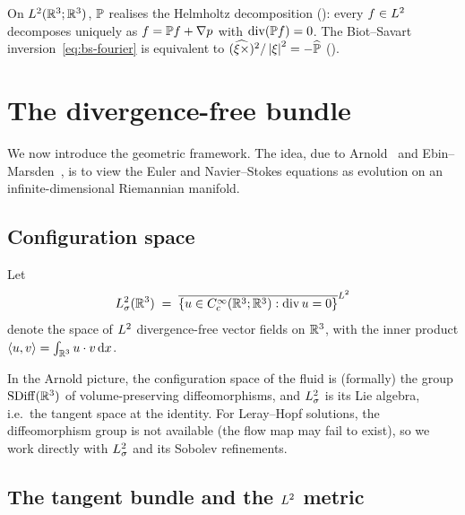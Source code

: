 \begin{remark}
  On $L^{2}(\mathbb{R}^3;\mathbb{R}^3)$, $\mathbb{P}$ realises the Helmholtz decomposition
  (): every $f \in L^{2}$ decomposes uniquely as
  $f = \mathbb{P} f + \nabla p$ with $\operatorname{div}(\mathbb{P} f) = 0$.
  The Biot--Savart inversion~\eqref{eq:bs-fourier} is equivalent to
  $(\widehat{\xi\times})^2/\left\lvert \xi \right\rvert^2 = -\widehat{\mathbb{P}}$
  ().
\end{remark}

\section{The divergence-free bundle}\label{sec:bs-bundle}

We now introduce the geometric framework.
The idea, due to Arnold~\cite{arnold1966} and
Ebin--Marsden~\cite{ebinMarsden1970}, is to view the Euler and
Navier--Stokes equations as evolution on an
infinite-dimensional Riemannian manifold.

\subsection{Configuration space}

\begin{definition}\label{def:Lsig}
  Let
  \begin{equation}\label{eq:Lsig-def}
    L^{2}_\sigma(\mathbb{R}^3) \;=\; \overline{\{u \in C^\infty_c(\mathbb{R}^3;\mathbb{R}^3) : \operatorname{div} u = 0\}}^{L^{2}}
  \end{equation}
  denote the space of $L^{2}$ divergence-free vector fields on $\mathbb{R}^3$, with the inner
  product $\left\langle u, v \right\rangle = \int_{\mathbb{R}^3} u \cdot v\,\mathrm{d} x$.
\end{definition}

In the Arnold picture, the configuration space of the fluid is (formally) the group
$\operatorname{SDiff}(\mathbb{R}^3)$ of volume-preserving diffeomorphisms, and $L^{2}_\sigma$ is
its Lie algebra, i.e.\ the tangent space at the identity.  For Leray--Hopf solutions,
the diffeomorphism group is not available (the flow map may fail to exist), so we work
directly with $L^{2}_\sigma$ and its Sobolev refinements.

\subsection{The tangent bundle and the $L^{2}$ metric}

